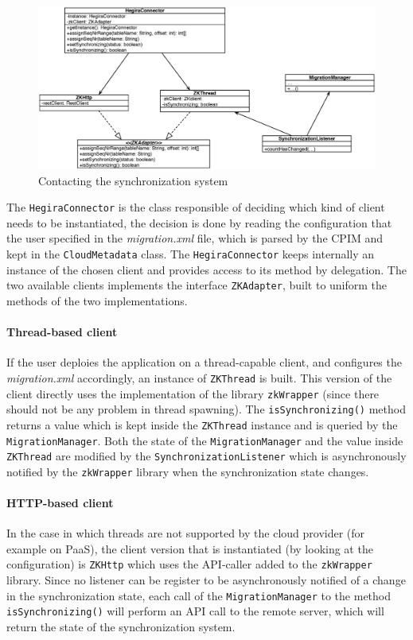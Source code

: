 \begin{figure}[tbh]
  \centering
  \includegraphics[width=14cm]{images/zk_adapter}
  \caption{Contacting the synchronization system}
  \label{fig:zk-adapter}
\end{figure} 

\noindent The \texttt{HegiraConnector} is the class responsible of deciding which kind of client needs to be instantiated, the decision is done by reading the configuration that the user specified in the \textit{migration.xml} file, which is parsed by the CPIM and kept in the \texttt{CloudMetadata} class. The \texttt{HegiraConnector}  keeps internally an instance of the chosen client and provides access to its method by delegation.
The two available clients implements the interface \texttt{ZKAdapter}, built to uniform the methods of the two implementations.

\paragraph{Thread-based client} If the user deploies the application on a thread-capable client, and configures the \textit{migration.xml} accordingly, an instance of \texttt{ZKThread} is built. This version of the client directly uses the implementation of the library \texttt{zkWrapper} (since there should not be any problem in thread spawning).
The \texttt{isSynchronizing()} method returns a value which is kept inside the \texttt{ZKThread} instance and is queried by the \texttt{MigrationManager}.
Both the state of the \texttt{MigrationManager} and the value inside \texttt{ZKThread} are modified by the \texttt{SynchronizationListener} which is asynchronously notified by the \texttt{zkWrapper} library when the synchronization state changes.

\paragraph{HTTP-based client} In the case in which threads are not supported by the cloud provider (for example on PaaS), the client version that is instantiated (by looking at the configuration) is \texttt{ZKHttp} which uses the API-caller added to the \texttt{zkWrapper} library.
Since no listener can be register to be asynchronously notified of a change in the synchronization state, each call of the \texttt{MigrationManager} to the method \texttt{isSynchronizing()} will perform an API call to the remote server, which will return the state of the synchronization system.

